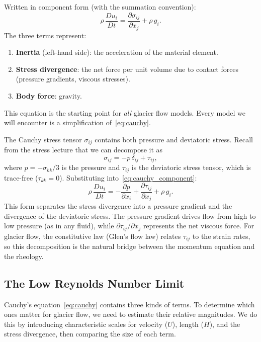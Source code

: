 \documentclass[11pt]{article}
\begin{document}
\medskip
\noindent Written in component form (with the summation convention):
\begin{equation}
  \rho\,\frac{Du_i}{Dt} = \frac{\partial \sigma_{ij}}{\partial x_j} + \rho\,g_i.
  \label{eq:cauchy_component}
\end{equation}
The three terms represent:
\begin{enumerate}[nosep]
  \item \textbf{Inertia} (left-hand side): the acceleration of the material element.
  \item \textbf{Stress divergence}: the net force per unit volume due to contact forces (pressure gradients, viscous stresses).
  \item \textbf{Body force}: gravity.
\end{enumerate}
This equation is the starting point for \emph{all} glacier flow models.  Every model we will encounter is a simplification of~\eqref{eq:cauchy}.

\medskip
\noindent The Cauchy stress tensor $\sigma_{ij}$ contains both pressure and deviatoric stress.  Recall from the stress lecture that we can decompose it as
\begin{equation}
  \sigma_{ij} = -p\,\delta_{ij} + \tau_{ij},
  \label{eq:stress_decomp}
\end{equation}
where $p = -\sigma_{kk}/3$ is the pressure and $\tau_{ij}$ is the deviatoric stress tensor, which is trace-free ($\tau_{kk} = 0$).  Substituting into~\eqref{eq:cauchy_component}:
\begin{equation}
  \rho\,\frac{Du_i}{Dt} = -\frac{\partial p}{\partial x_i} + \frac{\partial \tau_{ij}}{\partial x_j} + \rho\,g_i.
  \label{eq:cauchy_deviatoric}
\end{equation}
This form separates the stress divergence into a pressure gradient and the divergence of the deviatoric stress.  The pressure gradient drives flow from high to low pressure (as in any fluid), while $\partial\tau_{ij}/\partial x_j$ represents the net viscous force.  For glacier flow, the constitutive law (Glen's flow law) relates $\tau_{ij}$ to the strain rates, so this decomposition is the natural bridge between the momentum equation and the rheology.

\subsection{The Low Reynolds Number Limit}
\label{sec:stokes_limit}

Cauchy's equation~\eqref{eq:cauchy} contains three kinds of terms.  To determine which ones matter for glacier flow, we need to estimate their relative magnitudes.  We do this by introducing characteristic scales for velocity ($U$), length ($H$), and the stress divergence, then comparing the size of each term.
\end{document}
